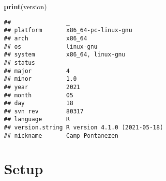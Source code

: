 \documentclass[]{book}
\newenvironment{Shaded}{\begin{snugshade}}{\end{snugshade}}
\newcommand{\KeywordTok}[1]{\textcolor[rgb]{0.13,0.29,0.53}{\textbf{#1}}}
\newcommand{\NormalTok}[1]{#1}
\begin{document}
\begin{Shaded}
\begin{Highlighting}[]
\KeywordTok{print}\NormalTok{(version)}
\end{Highlighting}
\end{Shaded}

\begin{verbatim}
##                _                           
## platform       x86_64-pc-linux-gnu         
## arch           x86_64                      
## os             linux-gnu                   
## system         x86_64, linux-gnu           
## status                                     
## major          4                           
## minor          1.0                         
## year           2021                        
## month          05                          
## day            18                          
## svn rev        80317                       
## language       R                           
## version.string R version 4.1.0 (2021-05-18)
## nickname       Camp Pontanezen
\end{verbatim}

\hypertarget{setup-2}{%
\section{Setup}\label{setup-2}}
\end{document}
